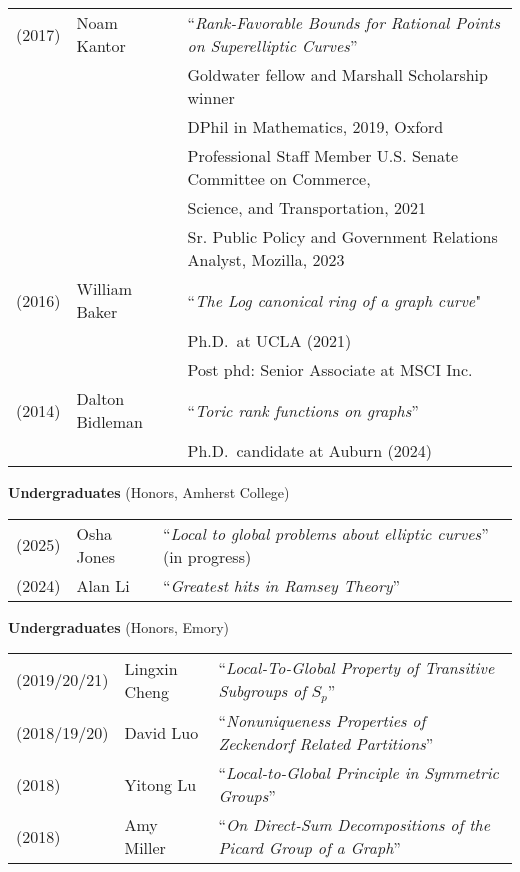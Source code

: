 \documentclass[margin,line]{res}
\newcommand{\defi}[1]{\textsf{#1}} 				%
\begin{document}
\begin{resume}
\begin{tabular}{lll}
  (2017) & \defi{Noam Kantor} & ``\emph{Rank-Favorable Bounds for Rational Points on Superelliptic Curves}'' \\
         &&   Goldwater fellow and Marshall Scholarship winner \\
         &&  DPhil in Mathematics, 2019,  Oxford \\
         &&  Professional Staff Member U.S. Senate Committee on Commerce,\\
         &&  \hspace{3pt} Science, and Transportation, 2021   \\
         &&  Sr. Public Policy and Government Relations Analyst, Mozilla, 2023   \\   
  (2016) & \defi{William Baker} & ``\emph{The Log canonical ring of a graph curve}" \\
         &&    Ph.D.~at UCLA (2021)\\
         &&    Post phd: Senior Associate at MSCI Inc.\\
  (2014) & \defi{Dalton Bidleman} & ``\emph{Toric rank functions on graphs}'' \\
  && Ph.D.~candidate at Auburn (2024)\\

\end{tabular}


{\bf Undergraduates} (Honors, Amherst College)
\vspace*{-.15in}

\begin{tabular}{lll}
  (2025) & \defi{Osha Jones} & ``\emph{Local to global problems about elliptic curves}'' (in progress)  \\
  (2024) & \defi{Alan Li} & ``\emph{Greatest hits in Ramsey Theory}''
\end{tabular}

{\bf Undergraduates} (Honors, Emory)
\vspace*{-.15in}

\begin{tabular}{lll}
  (2019/20/21) & \defi{Lingxin Cheng} & ``\emph{Local-To-Global Property of Transitive Subgroups of} $S_p$''\\
  (2018/19/20) & \defi{David Luo} & ``\emph{Nonuniqueness Properties of Zeckendorf Related Partitions}'' \\
  (2018) & \defi{Yitong Lu} & ``\emph{Local-to-Global Principle in Symmetric Groups}'' \\
  (2018) & \defi{Amy Miller} & ``\emph{On Direct-Sum Decompositions of the Picard Group of a Graph}''
\end{tabular}


\end{resume}
\end{document}
